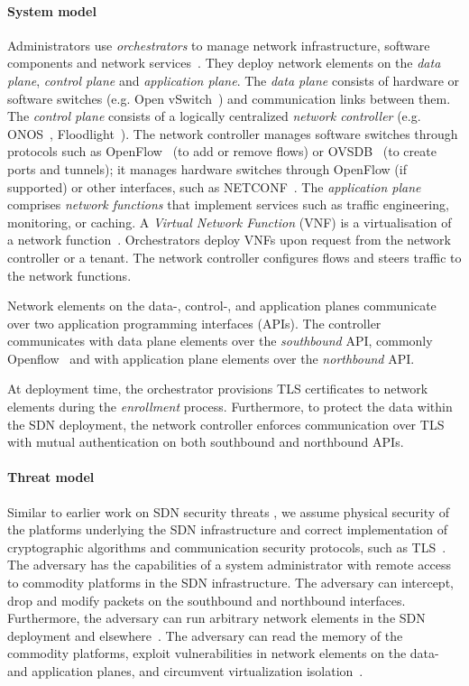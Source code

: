 {\paragraph{System model} 
Administrators use \textit{orchestrators} to manage network infrastructure, software components and network services~\cite{etsinfv:2013}.
They deploy network elements on the \textit{data plane}, \textit{control plane} and \textit{application plane}. %
The \textit{data plane} consists of hardware or software switches (e.g. Open vSwitch~\cite{pfaff:2015}) and communication links between them.
The \textit{control plane} consists of a logically centralized \textit{network controller} (e.g. ONOS~\cite{berde:2014}, Floodlight~\cite{floodlightapi}).
The network controller manages software switches through protocols such as OpenFlow~\cite{mckeown:2008} (to add or remove flows) or OVSDB~\cite{rfc7047} (to create ports and tunnels); 
it manages hardware switches through OpenFlow (if supported) or other interfaces, such as NETCONF~\cite{rfc6241}.
The \textit{application plane} comprises \textit{network functions} that implement services such as traffic engineering, monitoring, or caching.
A \textit{Virtual Network Function} (VNF) is a virtualisation of a network function~\cite{etsinfv:2013}.
Orchestrators deploy VNFs upon request from the network controller or a tenant. 
The network controller configures flows and steers traffic to the network functions.

Network elements on the data-, control-, and application planes communicate over two application programming interfaces (APIs).
The controller communicates with data plane elements over the \textit{southbound} API, commonly Openflow~\cite{mckeown:2008,sherwood:2010,bifulco:2016} and with application plane elements over the \textit{northbound} API.

At deployment time, the orchestrator provisions TLS certificates to network elements during the \textit{enrollment} process.
Furthermore, to protect the data within the SDN deployment, the network controller enforces communication over TLS with mutual authentication on both southbound and northbound APIs.

\paragraph{Threat model} Similar to earlier work on SDN security threats \cite{kreutz:2013,paladi:2015}, we assume physical security of the platforms underlying the SDN infrastructure and correct implementation of cryptographic algorithms and communication security protocols, such as TLS~\cite{rfc5246}. 
The adversary has the capabilities of a system administrator with remote access to commodity platforms in the SDN infrastructure.
The adversary can intercept, drop and modify packets on the southbound and northbound interfaces.
Furthermore, the adversary can run arbitrary network elements in the SDN deployment and elsewhere~\cite{etsinfv:2013}. 
The adversary can read the memory of the commodity platforms, exploit vulnerabilities in network elements on the data- and application planes, and circumvent virtualization isolation~\cite{antikainen:2014}.

}
